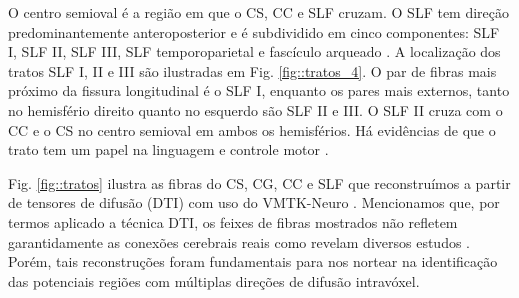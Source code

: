 O centro semioval é a região em que o CS, CC e SLF cruzam. O SLF  tem direção predominantemente anteroposterior e é subdividido em cinco componentes: SLF I, SLF II, SLF III, SLF temporoparietal e fascículo arqueado \cite{kamali2014}. A localização dos tratos SLF I, II e III são ilustradas em Fig. \ref{fig::tratos_4}. O par de fibras mais próximo da fissura longitudinal é o SLF I, enquanto os pares mais externos, tanto no hemisfério direito quanto no esquerdo são SLF II e III. O SLF II cruza com o CC e o CS no centro semioval em ambos os hemisférios. Há evidências de que o trato tem um papel na linguagem e controle motor \cite{fortin2012}.%

Fig. \ref{fig::tratos} ilustra as fibras do CS, CG, CC e SLF que reconstruímos a partir de tensores de difusão (DTI) com uso do VMTK-Neuro \cite{VMTKNeuro}. Mencionamos que, por termos aplicado a técnica DTI, os feixes de fibras mostrados não refletem garantidamente as conexões cerebrais reais como revelam diversos estudos \cite{berman2009, tournier2011, bucci2013, descoteaux2015, SCHILLING2019194}. Porém, tais reconstruções foram fundamentais para nos nortear na identificação das potenciais regiões com múltiplas direções de difusão intravóxel.



